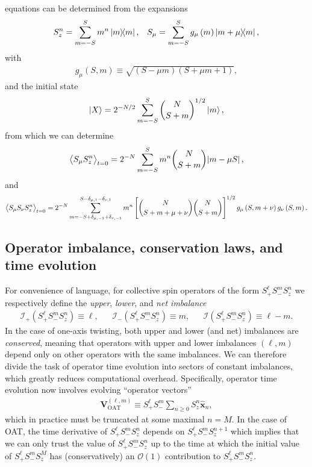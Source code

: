 \documentclass[aps,notitlepage,nofootinbib,11pt]{revtex4-1}
\renewcommand{\t}{\text} %
\newcommand{\p}[1]{\left(#1\right)} %
\renewcommand{\sp}[1]{\left[#1\right]} %
\renewcommand{\v}{\bm} %
\newcommand{\uv}[1]{\v{\hat{#1}}} %
\newcommand{\bk}{\Braket} %
\newcommand{\I}{\mathcal{I}}
\renewcommand{\O}{\mathcal{O}}
\newcommand{\1}{\mathds{1}}
\begin{document}
equations can be determined from the expansions
\begin{align}
  S_z^n = \sum_{m=-S}^S m^n \op{m},
  &&
  S_\mu = \sum_{m=-S}^S g_\mu\p{m} \op{m+\mu}{m},
\end{align}
with
\begin{align}
  g_\mu\p{S,m} \equiv \sqrt{\p{S-\mu m}\p{S+\mu m+1}},
  \label{eq:transverse_elem}
\end{align}
and the initial state
\begin{align}
  \ket{X} = 2^{-N/2} \sum_{m=-S}^S { N \choose S+m }^{1/2} \ket{m},
\end{align}
from which we can determine
\begin{align}
  \bk{S_\mu S_z^n}_{t=0}
  = 2^{-N} \sum_{m=-S}^S m^n { N \choose S+m } \abs{m - \mu S},
\end{align}
and
\begin{align}
  \bk{S_\mu S_\nu S_z^n}_{t=0}
  = 2^{-N} \sum_{m=-S+\delta_{\mu,-1}+\delta_{\nu,-1}}
  ^{S-\delta_{\mu,1}-\delta_{\nu,1}}
  m^n \sp{{ N \choose S+m+\mu+\nu } { N \choose S+m }}^{1/2}
  g_\mu\p{S,m+\nu} g_\nu\p{S,m}.
\end{align}


\subsection{Operator imbalance, conservation laws, and time evolution}

For convenience of language, for collective spin operators of the form
$S_+^\ell S_-^m S_z^n$ we respectively define the {\it upper}, {\it
  lower}, and {\it net imbalance}
\begin{align}
  \I_+\p{S_+^\ell S_-^m S_z^n} \equiv \ell,
  &&
  \I_-\p{S_+^\ell S_-^m S_z^n} \equiv m,
  &&
  \I\p{S_+^\ell S_-^m S_z^n} \equiv \ell - m.
\end{align}
In the case of one-axis twisting, both upper and lower (and net)
imbalances are {\it conserved}, meaning that operators with upper and
lower imbalances $\p{\ell,m}$ depend only on other operators with the
same imbalances.  We can therefore divide the task of operator time
evolution into sectors of constant imbalances, which greatly reduces
computational overhead.  Specifically, operator time evolution now
involves evolving ``operator vectors''
\begin{align}
  \v V_{\t{OAT}}^{(\ell,m)}
  \equiv S_+^\ell S_-^m \sum_{n\ge0} S_z^n \uv x_n,
\end{align}
which in practice must be truncated at some maximal $n=M$.  In the
case of OAT, the time derivative of $S_+^\ell S_-^m S_z^n$ depends on
$S_+^\ell S_-^m S_z^{n+1}$ which implies that we can only trust the
value of $S_+^\ell S_-^m S_z^n$ up to the time at which the initial
value of $S_+^\ell S_-^m S_z^M$ has (conservatively) an $\O\p{1}$
contribution to $S_+^\ell S_-^m S_z^n$.
\end{document}
